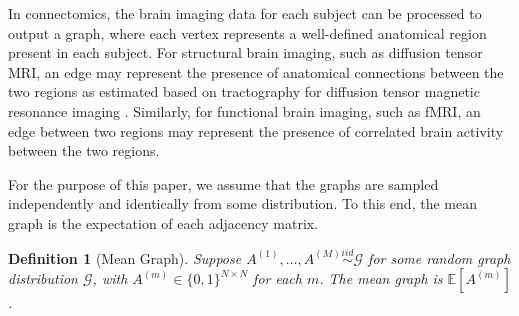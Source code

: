 \documentclass[journal,twoside,web]{ieeecolor}
\newtheorem{definition}[fact]{Definition}
\newcommand{\Ex}{\mathbb{E}}
\begin{document}
In connectomics, the  brain imaging data for each subject can be processed  to output a graph, where each vertex represents a well-defined anatomical region present in each subject.
For structural brain imaging, such as diffusion tensor MRI, an edge may represent the presence of anatomical connections between the two regions as estimated based on tractography for diffusion tensor magnetic resonance imaging \cite{gray2012magnetic}.
Similarly, for functional brain imaging, such as fMRI, an edge between two regions may represent the presence of correlated brain activity between the two regions.



For the purpose of this paper, we assume that the graphs are sampled independently and identically from some distribution.
To this end, the mean graph is the expectation of each adjacency matrix.
\begin{definition}[Mean Graph]
Suppose $A^{(1)},\dotsc,A^{(M)}\stackrel{iid}{\sim} \mathcal{G}$ for some random graph distribution $\mathcal{G}$, with $A^{(m)}\in\{0,1\}^{N\times N}$ for each $m$.
The {\em mean graph} is $\Ex[A^{(m)}]$.%
\end{definition}
\end{document}
